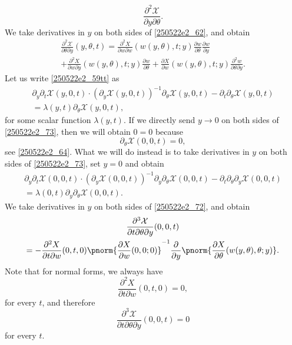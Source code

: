 \documentclass{article}
\numberwithin{equation}{section}
\theoremstyle{plain}
\begin{document}
\begin{equation}
\frac{\partial^2 \mathcal{X}}{\partial y \partial\theta}.
\end{equation}
We take derivatives in $y$ on both sides of \eqref{250522e2_62}, and obtain 
\begin{multline}\label{250522e2_74zzz}
\frac{\partial^2 \mathcal{X}}{\partial \theta\partial y}(y, \theta, t)= 
\frac{\partial^2 X}{\partial w\partial w}(w(y, \theta), t; y)\frac{\partial w}{\partial \theta}\frac{\partial w}{\partial y}\\
+ 
\frac{\partial^2 X}{\partial w\partial y}(w(y, \theta), t; y)\frac{\partial w}{\partial \theta}+
\frac{\partial X}{\partial w}(w(y, \theta), t; y) 
\frac{\partial^2 w}{\partial \theta\partial y}. 
\end{multline}
Let us write \eqref{250522e2_59tt} as 
\begin{multline}\label{250522e2_73}
\partial_y \partial_t \mathcal{X}(y, 0, t) \cdot
     (\partial_y \mathcal{X}(y, 0, t))^{-1} \partial_\theta \mathcal{X}(y, 0, t) - \partial_t \partial_\theta \mathcal{X}(y, 0, t)\\
     =\lambda(y, t) \partial_\theta \mathcal{X}(y, 0, t),
\end{multline}
for some scalar function $\lambda(y, t)$.   If we directly send $y\to 0$ on both sides of \eqref{250522e2_73}, then we will obtain $0=0$ because 
\begin{equation}
\partial_{\theta}\mathcal{X}(0, 0, t)=0,
\end{equation}
see \eqref{250522e2_64}. What we will do instead is to take derivatives in $y$ on both sides of \eqref{250522e2_73}, set $y=0$ and obtain 
\begin{multline}\label{250522e2_75}
\partial_y \partial_t \mathcal{X}(0, 0, t) \cdot
     (\partial_y \mathcal{X}(0, 0, t))^{-1} \partial_y\partial_\theta \mathcal{X}(0, 0, t) - \partial_t \partial_\theta \partial_y \mathcal{X}(0, 0, t)\\
     =\lambda(0, t) \partial_y \partial_\theta \mathcal{X}(0, 0, t).
\end{multline}
We take derivatives in $y$ on both sides of  \eqref{250522e2_72}, and obtain 
\begin{multline}
\frac{\partial^3{\mathcal{X}}}{\partial t \partial \theta
\partial y
}(0, 0, t)\\
=-
\frac{\partial^2 X}{\partial t\partial w}(0, t, 0)
\pnorm{
\frac{\partial X}{\partial w}(0, 0; 0)
}^{-1} 
\frac{\partial}{\partial y}\pnorm{
\frac{\partial X}{\partial \theta}(w(y, \theta), \theta; y)
}.
\end{multline}
Note that for normal forms, we always have 
\begin{equation}
\frac{\partial^2 X}{\partial t\partial w}(0, t, 0)=0,
\end{equation}
for every $t$, and therefore 
\begin{equation}
\frac{\partial^3{\mathcal{X}}}{\partial t \partial \theta
\partial y
}(0, 0, t)=0
\end{equation}
for every $t$. \\
\end{document}
